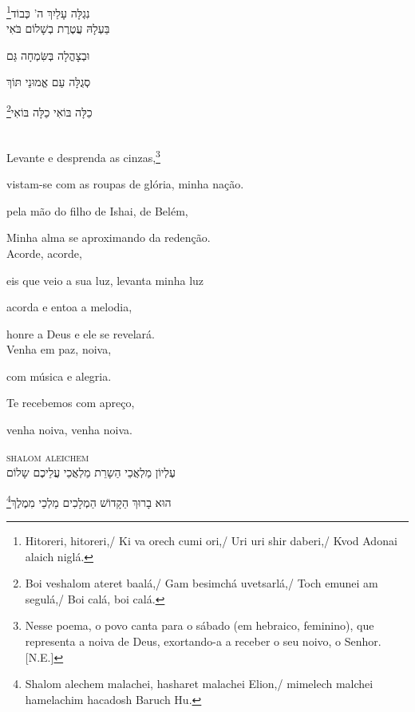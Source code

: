 נִגְלָּה עָלַיִךְ ה' כְּבוֹד\footnote{Hitoreri, hitoreri,/ Ki va orech cumi ori,/ Uri uri shir daberi,/
Kvod Adonai alaich niglá.}\\[10pt]

בַּעְלָהּ עֲטֶרֶת בְשָׁלוֹם בֹּאִי

וּבְצָהֳלָה בְּשִּׂמְחָה גַּם 

סְגֻלָּה עַם אֱמוּנֵי תּוֹךְ 

כַלָּה בּוֹאִי כַלָּה בּוֹאִי\footnote{
Boi veshalom ateret baalá,/ Gam besimchá uvetsarlá,/
Toch emunei am segulá,/ Boi calá, boi calá.}

\movetooddpage
\raggedright

\vspace*{1cm}

\textsc{}\\[15pt]


Levante e desprenda as cinzas,\footnote{Nesse poema, o povo canta para 
	o sábado (em hebraico, feminino), 
	que representa a noiva de Deus,
	exortando-a a receber o seu noivo, o Senhor. [N.E.]}

vistam-se com as roupas de glória, minha nação.

pela mão do filho de Ishai, de Belém,

Minha alma se aproximando da redenção.\\[10pt]

Acorde, acorde,

eis que veio a sua luz, levanta minha luz

acorda e entoa a melodia,

honre a Deus e ele se revelará.\\[10pt]

Venha em paz, noiva,

com música e alegria.

Te recebemos com apreço,

venha noiva, venha noiva.

\movetoevenpage
\raggedleft
{}

\vspace*{1cm}

\textsc{shalom aleichem}\\[15pt]

עֶלְיוֹן מַלְאֲכֵי הַשָרֵת מַלְאֲכֵי עֲלֵיכֶם שָלוֹם

הוּא בָרוּךְ הַקָדוֹשׁ הַמְלָכִים מַלְכֵי מִמֶלֶךְ\footnote{Shalom alechem malachei, hasharet malachei Elion,/
mimelech malchei hamelachim hacadosh Baruch Hu.}\\[10pt]

